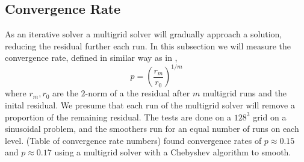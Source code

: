\subsection{Convergence Rate}
	As an iterative solver a multigrid solver will gradually approach a solution,
	reducing the residual further each run. In this subsection we will measure the convergence
	rate, defined in similar way as in \citet{zhukov_parallel_2014},
	\begin{equation}
		p = \left(\frac{r_m}{r_0}\right)^{1/m}
	\end{equation}
	where \(r_m, r_0\) are the \(2\)-norm of a the residual after \(m\) multigrid runs
 	and the inital residual. We presume that each run of the multigrid solver will
	remove a proportion of the remaining residual.
	The tests are done on a \(128^3\) grid on a sinusoidal
	problem, and the smoothers run for an equal number of runs on each level.
	\large{(Table of convergence rate numbers)}
	\citeauthor{zhukov_parallel_2014} found convergence rates of \(p \approx 0.15\) and \(p \approx 0.17\)
	using a multigrid solver with a Chebyshev algorithm to smooth.
